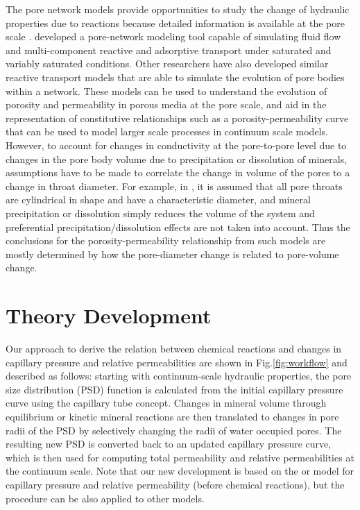 \documentclass[preprint,12pt,authoryear]{elsarticle}
\begin{document}
The pore network models provide opportunities to study the change of hydraulic properties due to reactions because detailed information is available at the pore scale \citep{algive2012impact}. \cite{raoof2013poreflow} developed a pore-network modeling tool capable of simulating fluid flow and multi-component reactive and adsorptive transport under saturated and variably saturated conditions. Other researchers \citep{nogues2013permeability, li2006upscaling, varloteaux2013pore} have also developed similar reactive transport models that are able to simulate the evolution of pore bodies within a network. These models can be used to understand the evolution of porosity and permeability in porous media at the pore scale, and aid in the representation of constitutive relationships such as a porosity-permeability curve that can be used to model larger scale processes in continuum scale models. However, to account for changes in conductivity at the pore-to-pore level due to changes in the pore body volume due to precipitation or dissolution of minerals, assumptions have to be made to correlate the change in volume of the pores to a change in throat diameter. For example, in \cite{nogues2013permeability}, it is assumed that all pore throats are cylindrical in shape and have a characteristic diameter, and mineral precipitation or dissolution simply reduces the volume of the system and preferential precipitation/dissolution effects are not taken into account. Thus the conclusions for the porosity-permeability relationship from such models are mostly determined by how the pore-diameter change is related to pore-volume change. 

\section{Theory Development}
\label{S:3}
Our approach to derive the relation between chemical reactions and changes in capillary pressure and relative permeabilities are shown in Fig.\ref{fig:workflow} and described as follows: starting with continuum-scale hydraulic properties, the pore size distribution (PSD) function is calculated from the initial capillary pressure curve using the capillary tube concept. Changes in mineral volume through equilibrium or kinetic mineral reactions are then translated to changes in pore radii of the PSD by selectively changing the radii of water occupied pores. The resulting new PSD is converted back to an updated capillary pressure curve, which is then used for computing total permeability and relative permeabilities at the continuum scale. Note that our new development is based on the \cite{mualem1976new} or \cite{van1980closed} model for capillary pressure and relative permeability (before chemical reactions), but the procedure can be also applied to other models. 
\end{document}
